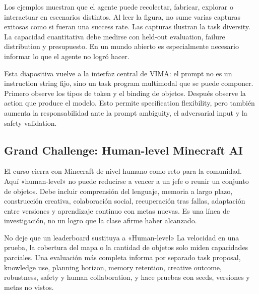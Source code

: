 
Los ejemplos muestran que el agente puede recolectar, fabricar, explorar o interactuar en escenarios distintos. Al leer la figura, no sume varias capturas exitosas como si fueran una success rate. Las capturas ilustran la task diversity. La capacidad cuantitativa debe medirse con held-out evaluation, failure distribution y presupuesto. En un mundo abierto es especialmente necesario informar lo que el agente no logró hacer.


Esta diapositiva vuelve a la interfaz central de VIMA: el prompt no es un instruction string fijo, sino un task program multimodal que se puede componer. Primero observe los tipos de token y el binding de objetos. Después observe la action que produce el modelo. Esto permite specification flexibility, pero también aumenta la responsabilidad ante la prompt ambiguity, el adversarial input y la safety validation.

\subsection{Grand Challenge: Human-level Minecraft AI}

El curso cierra con Minecraft de nivel humano como reto para la comunidad. Aquí «human-level» no puede reducirse a vencer a un jefe o reunir un conjunto de objetos. Debe incluir comprensión del lenguaje, memoria a largo plazo, construcción creativa, colaboración social, recuperación tras fallas, adaptación entre versiones y aprendizaje continuo con metas nuevas. Es una línea de investigación, no un logro que la clase afirme haber alcanzado.


\begin{warningbox}{No deje que un leaderboard sustituya a «Human-level»}
La velocidad en una prueba, la cobertura del mapa o la cantidad de objetos solo miden capacidades parciales. Una evaluación más completa informa por separado task proposal, knowledge use, planning horizon, memory retention, creative outcome, robustness, safety y human collaboration, y hace pruebas con seeds, versiones y metas no vistos.
\end{warningbox}

